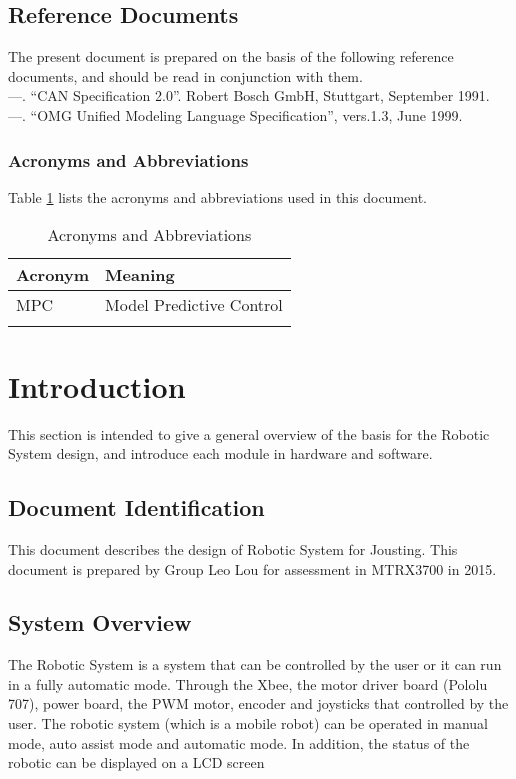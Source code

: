 \documentclass[MTRX3700report.tex]{subfiles}
\begin{document}
\subsection{Reference Documents}
  The present document is prepared on the basis of the following reference documents, and should be read in conjunction with them.\\
  —.  “CAN Specification 2.0”.  Robert Bosch GmbH, Stuttgart, September 1991.\\
  —.  “OMG Unified Modeling Language Specification”, vers.1.3, June 1999.

\subsubsection{Acronyms and Abbreviations}
  Table \ref{Acro} lists the acronyms and abbreviations used in this document.
  \begin{table}[h]
  \centering
  \caption{Acronyms and Abbreviations}
  \label{Acro}
  \begin{tabular}{|l|l|}
  \hline Acronym & Meaning \\
  \hline MPC & Model Predictive Control \\
  \hline & \\
  \hline
  \end{tabular}
  \end{table}

\section{Introduction}
This section is intended to give a general overview of the basis for the Robotic System design, and introduce each module in hardware and software.
\subsection{Document Identification}
This document describes the design of Robotic System for Jousting. This document is prepared by Group Leo Lou for assessment in MTRX3700 in 2015.
\subsection{System Overview}
The Robotic System is a system that can be controlled by the user or it can run in a fully automatic mode. Through the Xbee, the motor driver board (Pololu 707), power board, the PWM motor, encoder and joysticks that controlled by the user. The robotic system (which is a mobile robot) can be operated in manual mode, auto assist mode and automatic mode. In addition, the status of the robotic can be displayed on a LCD screen
\end{document}
